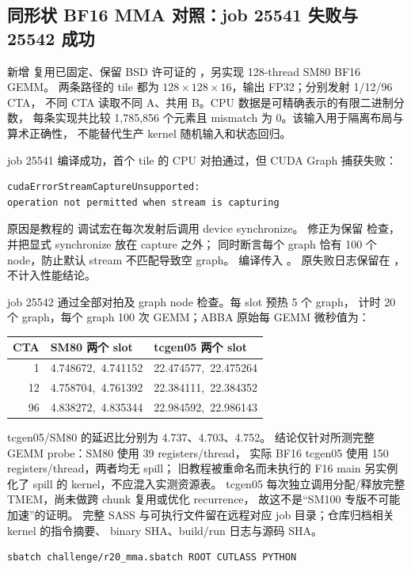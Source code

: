 \subsection{同形状 BF16 MMA 对照：job 25541 失败与 25542 成功}

新增  复用已固定、保留 BSD 许可证的
，另实现 128-thread SM80 BF16 GEMM。
两条路径的 tile 都为 $128\times128\times16$，输出 FP32；分别发射 1/12/96 CTA，
不同 CTA 读取不同 A、共用 B。CPU 数据是可精确表示的有限二进制分数，
每条实现共比较 1,785,856 个元素且 mismatch 为 0。该输入用于隔离布局与算术正确性，
不能替代生产 kernel 随机输入和状态回归。

job 25541 编译成功，首个 tile 的 CPU 对拍通过，但 CUDA Graph 捕获失败：
\begin{lstlisting}
cudaErrorStreamCaptureUnsupported:
operation not permitted when stream is capturing
\end{lstlisting}
原因是教程的  调试宏在每次发射后调用 device synchronize。
修正为保留  检查，并把显式 synchronize 放在 capture 之外；
同时断言每个 graph 恰有 100 个 node，防止默认 stream 不匹配导致空 graph。
编译传入 。
原失败日志保留在 ，不计入性能结论。

job 25542 通过全部对拍及 graph node 检查。每 slot 预热 5 个 graph，
计时 20 个 graph，每个 graph 100 次 GEMM；ABBA 原始每 GEMM 微秒值为：
\begin{center}\small
\begin{tabular}{@{}rll@{}}\toprule
CTA&SM80 两个 slot&tcgen05 两个 slot\\\midrule
1&4.748672,\ 4.741152&22.474577,\ 22.475264\\
12&4.758704,\ 4.761392&22.384111,\ 22.384352\\
96&4.838272,\ 4.835344&22.984592,\ 22.986143\\\bottomrule
\end{tabular}
\end{center}

tcgen05/SM80 的延迟比分别为 4.737、4.703、4.752。
结论仅针对所测完整 GEMM probe：SM80 使用 39 registers/thread，
实际 BF16 tcgen05 使用 150 registers/thread，两者均无 spill；
旧教程被重命名而未执行的 F16 main 另实例化了 spill 的 kernel，不应混入实测资源表。
tcgen05 每次独立调用分配/释放完整 TMEM，尚未做跨 chunk 复用或优化 recurrence，
故这不是“SM100 专版不可能加速”的证明。
完整 SASS 与可执行文件留在远程对应 job 目录；仓库归档相关 kernel 的指令摘要、
binary SHA、build/run 日志与源码 SHA。
\begin{lstlisting}
sbatch challenge/r20_mma.sbatch ROOT CUTLASS PYTHON
\end{lstlisting}


